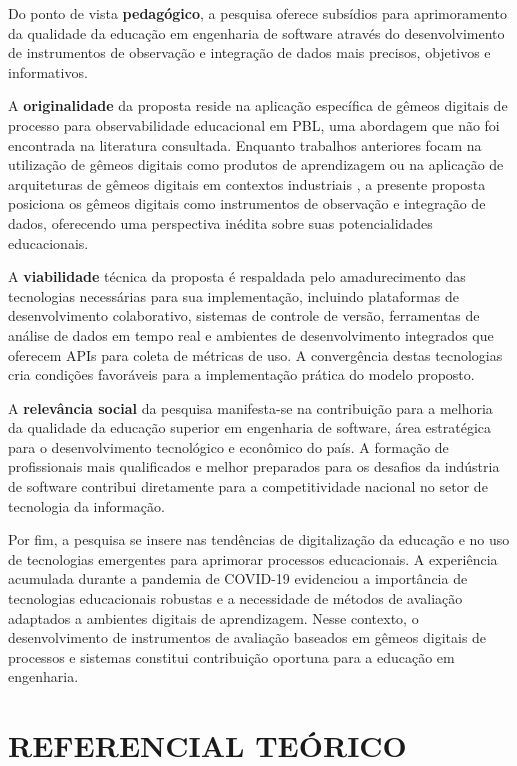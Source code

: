 \documentclass[12pt,a4paper]{article}
\begin{document}
Do ponto de vista \textbf{pedagógico}, a pesquisa oferece subsídios para
aprimoramento da qualidade da educação em engenharia de software através do
desenvolvimento de instrumentos de observação e integração de dados mais
precisos, objetivos e informativos.

A \textbf{originalidade} da proposta reside na aplicação específica de gêmeos
digitais de processo para observabilidade educacional em PBL, uma abordagem que não
foi encontrada na literatura consultada. Enquanto trabalhos anteriores focam na
utilização de gêmeos digitais como produtos de aprendizagem
ou na aplicação de arquiteturas de gêmeos digitais em contextos industriais
\cite{arakaki2022}, a presente proposta posiciona os gêmeos digitais como
instrumentos de observação e integração de dados, oferecendo uma perspectiva inédita sobre
suas potencialidades educacionais.

A \textbf{viabilidade} técnica da proposta é respaldada pelo amadurecimento das
tecnologias necessárias para sua implementação, incluindo plataformas de
desenvolvimento colaborativo, sistemas de controle de versão, ferramentas de
análise de dados em tempo real e ambientes de desenvolvimento integrados que
oferecem APIs para coleta de métricas de uso. A convergência destas tecnologias
cria condições favoráveis para a implementação prática do modelo proposto.

A \textbf{relevância social} da pesquisa manifesta-se na contribuição para a
melhoria da qualidade da educação superior em engenharia de software, área
estratégica para o desenvolvimento tecnológico e econômico do país. A formação
de profissionais mais qualificados e melhor preparados para os desafios da
indústria de software contribui diretamente para a competitividade nacional no
setor de tecnologia da informação.

Por fim, a pesquisa se insere nas tendências de digitalização da educação e no uso de tecnologias emergentes para aprimorar processos educacionais. A experiência acumulada durante a pandemia de COVID-19 evidenciou a importância de tecnologias educacionais robustas e a necessidade de métodos de avaliação adaptados a ambientes digitais de aprendizagem. Nesse contexto, o desenvolvimento de instrumentos de avaliação baseados em gêmeos digitais de processos e sistemas constitui contribuição oportuna para a educação em engenharia.

\newpage
\section{REFERENCIAL TEÓRICO}
\end{document}
